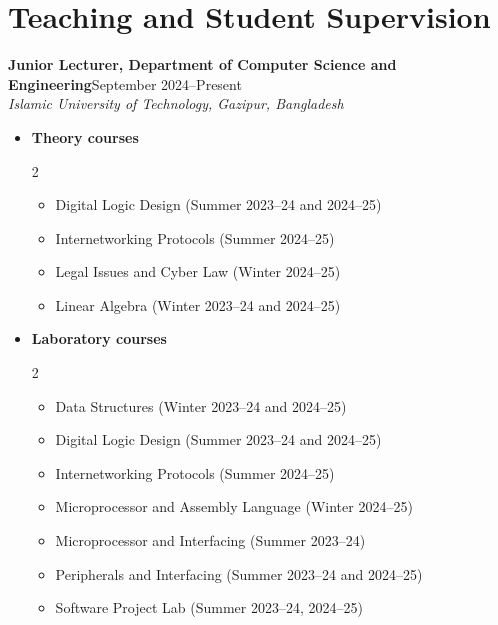 \documentclass[10pt,letterpaper]{article}
\newcommand{\entry}[3]{%
    \textbf{#1}\hfill #2\\[-1pt]
    #3
}
\newenvironment{cvitems}{%
    \begin{itemize}[
        leftmargin=13pt,
        topsep=2pt,
        itemsep=1pt,
        parsep=0pt,
        partopsep=0pt
    ]
}{\end{itemize}}
\newenvironment{courseitems}{%
    \footnotesize
    \begin{itemize}[
        label=$\circ$,
        leftmargin=14pt,
        topsep=1pt,
        itemsep=0pt,
        parsep=0pt,
        partopsep=0pt
    ]
}{\end{itemize}}
\begin{document}
\vspace{9pt}
\begin{minipage}{\textwidth}
\section{Teaching and Student Supervision}
\entry{Junior Lecturer, Department of Computer Science and Engineering}{September 2024--Present}{%
    \textit{Islamic University of Technology, Gazipur, Bangladesh}
    \begin{cvitems}
        \vspace{-1pt}
        \item \textbf{Theory courses}
        {\setlength{\multicolsep}{0pt}
        \begin{multicols}{2}
        \begin{courseitems}
            \item Digital Logic Design  (Summer 2023--24 and 2024--25)
            \item Internetworking Protocols (Summer 2024--25)
            \item Legal Issues and Cyber Law (Winter 2024--25)
            \item Linear Algebra (Winter 2023--24 and 2024--25)
        \end{courseitems}
        \end{multicols}}
        \vspace{-1pt}
        \item \textbf{Laboratory courses}
        {\setlength{\multicolsep}{0pt}
        \begin{multicols}{2}
        \begin{courseitems}
            \item Data Structures (Winter 2023--24 and 2024--25)
            \item Digital Logic Design (Summer 2023--24 and 2024--25)
            \item Internetworking Protocols (Summer 2024--25)
            \item Microprocessor and Assembly Language (Winter 2024--25)
            \item Microprocessor and Interfacing (Summer 2023--24)
            \item Peripherals and Interfacing (Summer 2023--24 and 2024--25)
            \item Software Project Lab (Summer 2023--24, 2024--25)

\end{courseitems}
\end{multicols}}
\end{cvitems}}
\end{minipage}
\end{document}
